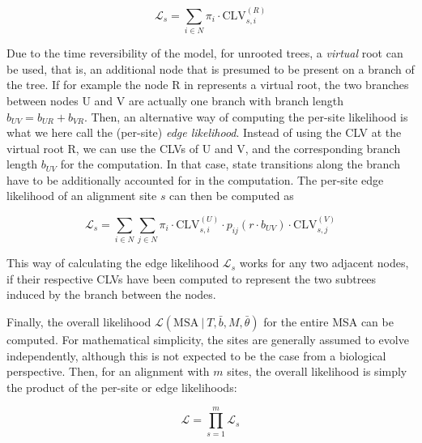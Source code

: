 \begin{equation}
    \label{ch:Foundations:sec:MLTreeInference:eq:root_site_likelihood}
    \mathcal{L}_{s} = \sum_{i \in N} \pi_i \cdot \mbox{CLV}^{(R)}_{s,i}
\end{equation}

Due to the time reversibility of the model, for unrooted trees, a \emph{virtual} root can be used,
that is, an additional node that is presumed to be present on a branch of the tree.
If for example the node {\sffamily R} in  represents a virtual root,
the two branches between nodes {\sffamily U} and {\sffamily V}
are actually one branch with branch length $b_{UV} = b_{UR} + b_{VR}$.
Then, an alternative way of computing the per-site likelihood is what we here call the (per-site) \emph{edge likelihood}.
Instead of using the CLV at the virtual root {\sffamily R}, we can use the CLVs of {\sffamily U} and {\sffamily V},
and the corresponding branch length $b_{UV}$ for the computation.
In that case, state transitions along the branch have to be additionally accounted for in the computation.
The per-site edge likelihood of an alignment site $s$ can then be computed as

\begin{equation}
    \label{ch:Foundations:sec:MLTreeInference:eq:edge_likelihood}
    \mathcal{L}_{s} = \sum_{i \in N} \sum_{j \in N} \pi_i \cdot \mbox{CLV}^{(U)}_{s,i} \cdot
    p_{ij}(r \cdot b_{UV}) \cdot \mbox{CLV}^{(V)}_{s,j}
\end{equation}

This way of calculating the edge likelihood $\mathcal{L}_s$ works for any two adjacent nodes,
if their respective CLVs have been computed to represent the two subtrees induced by the branch between the nodes.

Finally, the overall likelihood $\mathcal{L}( \mbox{MSA} ~|~ T, \bar{b}, M, \bar{\theta} )$
for the entire MSA can be computed.
For mathematical simplicity, the sites are generally assumed to evolve independently,
although this is not expected to be the case from a biological perspective.
Then, for an alignment with $m$ sites, the overall likelihood is simply the product of the per-site or edge likelihoods:

\begin{equation}
    \label{ch:Foundations:sec:MLTreeInference:eq:root_likelihood}
    \mathcal{L} = \prod_{s=1}^{m} \mathcal{L}_s
\end{equation}

